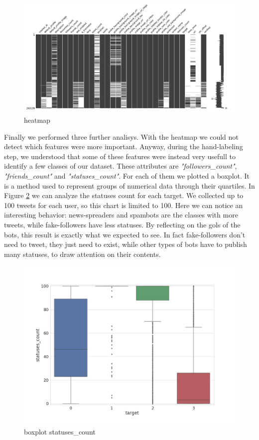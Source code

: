 \begin{figure}
	\centering
	\includegraphics[width=\columnwidth]{chapter3/figure/msno.png}
	\caption{heatmap}
	\label{fig:msno}
\end{figure}

\newpage
Finally we performed three further analisys. With the heatmap we could not detect which features were more important. Anyway, during the hand-labeling step, we understood that some of these features were instead very usefull to identify a few classes of our dataset. These attributes are \emph{"followers\_count"}, \emph{"friends\_count"} and \emph{"statuses\_count"}. For each of them we plotted a boxplot. It is a method used to represent groups of numerical data through their quartiles. In Figure \ref{fig:box_statuses} we can analyze the statuses count for each target. We collected up to 100 tweets for each user, so this chart is limited to 100. Here we can notice an interesting behavior: news-spreaders and spambots are the classes with more tweets, while fake-followers have less statuses. By reflecting on the gols of the bots, this result is exactly what we expected to see. In fact fake-followers don't need to tweet, they just need to exist, while other types of bots have to publish many statuses, to draw attention on their contents.

\begin{figure}
	\centering
	\includegraphics[width=\columnwidth]{chapter3/figure/boxplot.jpg}
	\caption{boxplot statuses\_count}
	\label{fig:box_statuses}
\end{figure}
\newpage

